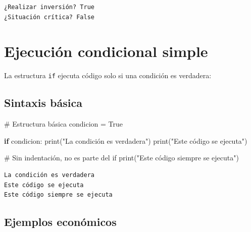 \documentclass[
  doc,
  floatsintext,
  longtable,
  a4paper,
  nolmodern,
  notxfonts,
  notimes,
  12pt,
  colorlinks=true,linkcolor=blue,citecolor=blue,urlcolor=blue]{apa7}
\newenvironment{Shaded}{\begin{snugshade}}{\end{snugshade}}
\newcommand{\BuiltInTok}[1]{\textcolor[rgb]{0.00,0.23,0.31}{#1}}
\newcommand{\CommentTok}[1]{\textcolor[rgb]{0.37,0.37,0.37}{#1}}
\newcommand{\ControlFlowTok}[1]{\textcolor[rgb]{0.00,0.23,0.31}{\textbf{#1}}}
\newcommand{\NormalTok}[1]{\textcolor[rgb]{0.00,0.23,0.31}{#1}}
\newcommand{\OperatorTok}[1]{\textcolor[rgb]{0.37,0.37,0.37}{#1}}
\newcommand{\StringTok}[1]{\textcolor[rgb]{0.13,0.47,0.30}{#1}}
\newcommand{\VariableTok}[1]{\textcolor[rgb]{0.07,0.07,0.07}{#1}}
\begin{document}
\begin{verbatim}
¿Realizar inversión? True
¿Situación crítica? False
\end{verbatim}

\section{Ejecución condicional
simple}\label{ejecuciuxf3n-condicional-simple}

La estructura \texttt{if} ejecuta código solo si una condición es
verdadera:

\subsection{Sintaxis básica}\label{sintaxis-buxe1sica}

\begin{Shaded}
\begin{Highlighting}[]
\CommentTok{\# Estructura básica}
\NormalTok{condicion }\OperatorTok{=} \VariableTok{True}

\ControlFlowTok{if}\NormalTok{ condicion:}
    \BuiltInTok{print}\NormalTok{(}\StringTok{"La condición es verdadera"}\NormalTok{)}
    \BuiltInTok{print}\NormalTok{(}\StringTok{"Este código se ejecuta"}\NormalTok{)}

\CommentTok{\# Sin indentación, no es parte del if}
\BuiltInTok{print}\NormalTok{(}\StringTok{"Este código siempre se ejecuta"}\NormalTok{)}
\end{Highlighting}
\end{Shaded}

\begin{verbatim}
La condición es verdadera
Este código se ejecuta
Este código siempre se ejecuta
\end{verbatim}

\subsection{Ejemplos económicos}\label{ejemplos-econuxf3micos}
\end{document}
